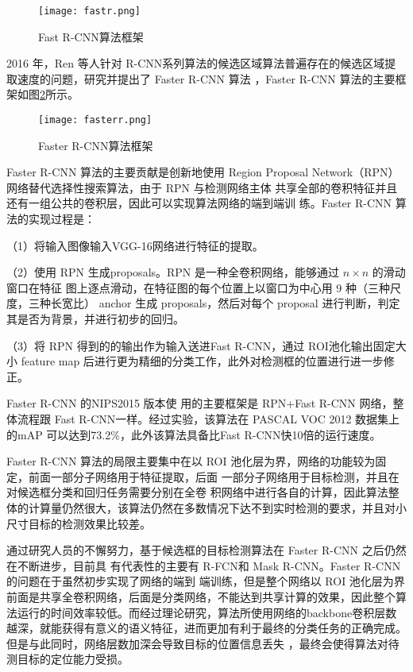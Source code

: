 \begin{figure}[htbp]
    \centering
    \texttt{[image: fastr.png]}
    \caption{Fast R-CNN算法框架}
    \label{fastr}
\end{figure}

2016 年，Ren 等人针对 R-CNN系列算法的候选区域算法普遍存在的候选区域提取速度的问题，研究并提出了 Faster R-CNN 算法
\cite{ren2015faster}，Faster R-CNN 算法的主要框架如图\ref{fasterr}所示。

\begin{figure}[htbp]
    \centering
    \texttt{[image: fasterr.png]}
    \caption{Faster R-CNN算法框架}
    \label{fasterr}
\end{figure}

Faster R-CNN 算法的主要贡献是创新地使用 Region
Proposal Network（RPN）网络替代选择性搜索算法，由于 RPN 与检测网络主体
共享全部的卷积特征并且还有一组公共的卷积层，因此可以实现算法网络的端到端训
练。Faster R-CNN 算法的实现过程是：

（1）将输入图像输入VGG-16网络进行特征的提取。

（2）使用 RPN 生成proposals。RPN 是一种全卷积网络，能够通过 $n \times n$ 的滑动窗口在特征
图上逐点滑动，在特征图的每个位置上以窗口为中心用 9 种（三种尺度，三种长宽比）
anchor 生成 proposals，然后对每个 proposal 进行判断，判定其是否为背景，并进行初步的回归。

（3）将 RPN 得到的的输出作为输入送进Fast R-CNN，通过 ROI池化输出固定大小 feature map 后进行更为精细的分类工作，此外对检测框的位置进行进一步修正。

Faster R-CNN 的NIPS2015 版本使
用的主要框架是 RPN+Fast R-CNN 网络，整体流程跟 Fast R-CNN一样。经过实验，该算法在 PASCAL VOC 2012 数据集上的mAP 可以达到73.2$\%$，此外该算法具备比Fast R-CNN快10倍的运行速度。

Faster R-CNN 算法的局限主要集中在以 ROI 池化层为界，网络的功能较为固定，前面一部分子网络用于特征提取，后面
一部分子网络用于目标检测，并且在对候选框分类和回归任务需要分别在全卷
积网络中进行各自的计算，因此算法整体的计算量仍然很大，该算法仍然在多数情况下达不到实时检测的要求，并且对小尺寸目标的检测效果比较差。

通过研究人员的不懈努力，基于候选框的目标检测算法在 Faster R-CNN 之后仍然在不断进步，目前具
有代表性的主要有 R-FCN\cite{dai2016r}和 Mask R-CNN\cite{he2017mask}。Faster R-CNN 的问题在于虽然初步实现了网络的端到
端训练，但是整个网络以 ROI 池化层为界前面是共享全卷积网络，后面是分类网络，不能达到共享计算的效果，因此整个算
法运行的时间效率较低。而经过理论研究，算法所使用网络的backbone卷积层数越深，就能获得有意义的语义特征，进而更加有利于最终的分类任务的正确完成。但是与此同时，网络层数加深会导致目标的位置信息丢失
，最终会使得算法对待测目标的定位能力受损。

